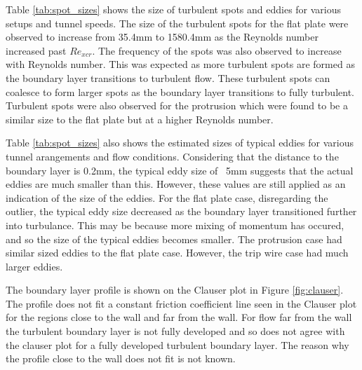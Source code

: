 \documentclass{article}
\begin{document}

Table \ref{tab:spot_sizes} shows the size of turbulent spots and eddies for various setups and tunnel speeds.
The size of the turbulent spots for the flat plate were observed to increase from 35.4mm to 1580.4mm as the Reynolds number increased past $Re_{xcr}$.
The frequency of the spots was also observed to increase with Reynolds number.
This was expected as more turbulent spots are formed as the boundary layer transitions to turbulent flow.
These turbulent spots can coalesce to form larger spots as the boundary layer transitions to fully turbulent.
Turbulent spots were also observed for the protrusion which were found to be a similar size to the flat plate but at a higher Reynolds number.


Table \ref{tab:spot_sizes} also shows the estimated sizes of typical eddies for various tunnel arangements and flow conditions.
Considering that the distance to the boundary layer is 0.2mm, the typical eddy size of ~5mm suggests that the actual eddies are much smaller than this.
However, these values are still applied as an indication of the size of the eddies.
For the flat plate case, disregarding the outlier, the typical eddy size decreased as the boundary layer transitioned further into turbulance.
This may be because more mixing of momentum has occured, and so the size of the typical eddies becomes smaller.
The protrusion case had similar sized eddies to the flat plate case.
However, the trip wire case had much larger eddies.


The boundary layer profile is shown on the Clauser plot in Figure \ref{fig:clauser}.
The profile does not fit a constant friction coefficient line seen in the Clauser plot for the regions close to the wall and far from the wall.
For flow far from the wall the turbulent boundary layer is not fully developed and so does not agree with the clauser plot for a fully developed turbulent boundary layer.
The reason why the profile close to the wall does not fit is not known.
\end{document}
